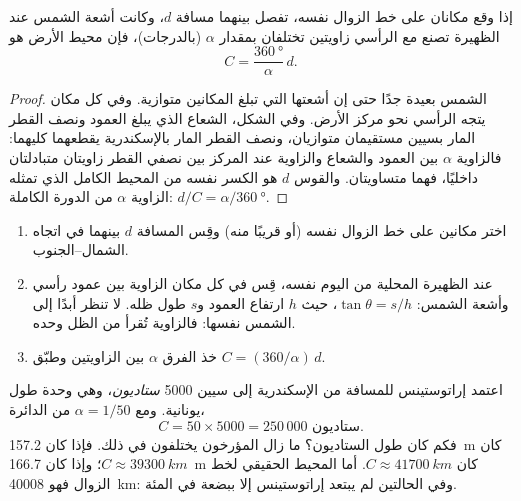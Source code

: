 \begin{proposition}\label{prop:g10:measuring-the-earth:eratosthenes}
إذا وقع مكانان على خط الزوال نفسه، تفصل بينهما مسافة $d$، وكانت أشعة الشمس عند
الظهيرة تصنع مع الرأسي زاويتين تختلفان بمقدار $\alpha$ (بالدرجات)، فإن محيط
الأرض هو
\[
  C = \frac{\qty{360}{\degree}}{\alpha}\, d .
\]
\end{proposition}

\begin{proof}
الشمس بعيدة جدًا حتى إن أشعتها التي تبلغ المكانين متوازية. وفي كل مكان يتجه
الرأسي نحو مركز الأرض. وفي الشكل، الشعاع الذي يبلغ العمود ونصف القطر المار
بسيين مستقيمان متوازيان، ونصف القطر المار بالإسكندرية يقطعهما كليهما: فالزاوية
$\alpha$ بين العمود والشعاع والزاوية عند المركز بين نصفي القطر زاويتان متبادلتان
داخليًا، فهما متساويتان. والقوس $d$ هو الكسر نفسه من المحيط الكامل الذي تمثله
الزاوية $\alpha$ من الدورة الكاملة:
$d/C = \alpha/\qty{360}{\degree}$.
\end{proof}

\begin{method}\label{met:g10:measuring-the-earth:shadows}
\begin{enumerate}
  \item اختر مكانين على خط الزوال نفسه (أو قريبًا منه) وقِس المسافة
        $d$ بينهما في اتجاه الشمال--الجنوب.
  \item عند الظهيرة المحلية من اليوم نفسه، قِس في كل مكان الزاوية بين عمود
        رأسي وأشعة الشمس: $\tan \theta = s/h$، حيث $h$ ارتفاع العمود و$s$ طول
        ظله. لا تنظر أبدًا إلى الشمس نفسها: فالزاوية تُقرأ من الظل
        وحده.
  \item خذ الفرق $\alpha$ بين الزاويتين وطبّق
        $C = (360/\alpha)\,d$.
\end{enumerate}
\end{method}

\begin{example}\label{ex:g10:measuring-the-earth:numbers}
اعتمد إراتوستينس للمسافة من الإسكندرية إلى سيين 5000
\emph{ستاديون}، وهي وحدة طول يونانية. ومع $\alpha = 1/50$ من الدائرة،
\[
  C = 50 \times 5000 = 250\,000 \text{ ستاديون}.
\]
فكم كان طول الستاديون؟ ما زال المؤرخون يختلفون في ذلك. فإذا كان
\qty{157.2}{m} كان $C \approx \qty{39300}{km}$؛ وإذا كان \qty{166.7}{m} كان
$C \approx \qty{41700}{km}$. أما المحيط الحقيقي لخط الزوال فهو
\qty{40008}{km}: وفي الحالتين لم يبتعد إراتوستينس إلا ببضعة في المئة.
\end{example}


